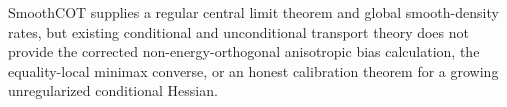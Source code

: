 SmoothCOT supplies a regular central limit theorem and global smooth-density rates, but existing conditional and unconditional transport theory does not provide the corrected non-energy-orthogonal anisotropic bias calculation, the equality-local minimax converse, or an honest calibration theorem for a growing unregularized conditional Hessian.